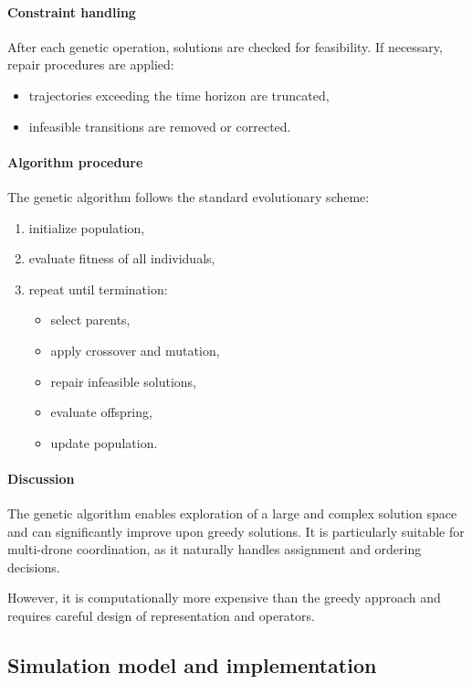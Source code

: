 \documentclass[english]{projectreport}
\begin{document}
\paragraph{Constraint handling}

After each genetic operation, solutions are checked for feasibility. If necessary, repair procedures are applied:
\begin{itemize}
    \item trajectories exceeding the time horizon are truncated,
    \item infeasible transitions are removed or corrected.
\end{itemize}

\paragraph{Algorithm procedure}

The genetic algorithm follows the standard evolutionary scheme:
\begin{enumerate}
    \item initialize population,
    \item evaluate fitness of all individuals,
    \item repeat until termination:
    \begin{itemize}
        \item select parents,
        \item apply crossover and mutation,
        \item repair infeasible solutions,
        \item evaluate offspring,
        \item update population.
    \end{itemize}
\end{enumerate}

\paragraph{Discussion}

The genetic algorithm enables exploration of a large and complex solution space and can significantly improve upon greedy solutions. It is particularly suitable for multi-drone coordination, as it naturally handles assignment and ordering decisions.

However, it is computationally more expensive than the greedy approach and requires careful design of representation and operators.


\subsection{Simulation model and implementation}
\end{document}
